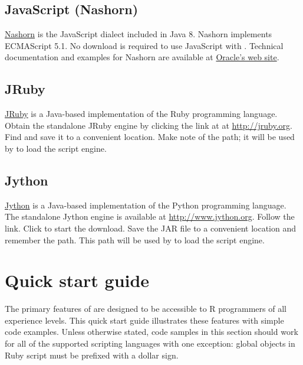 \subsection{JavaScript (Nashorn)}

\href{https://docs.oracle.com/javase/8/docs/technotes/guides/scripting/nashorn/}{Nashorn} is the JavaScript dialect included in Java 8. Nashorn implements ECMAScript 5.1. No download is required to use JavaScript with . Technical documentation and examples for Nashorn are available at \href{https://docs.oracle.com/javase/8/docs/technotes/guides/scripting/nashorn/}{Oracle's web site}.

\subsection{JRuby}

\href{http://jruby.org}{JRuby} is a Java-based implementation of the Ruby programming language. Obtain the standalone JRuby engine by clicking the  link at at \url{http://jruby.org}. Find  and save it to a convenient location. Make note of the path; it will be used by  to load the script engine.

\subsection{Jython}

\href{http://www.jython.org}{Jython} is a Java-based implementation of the Python programming language. The standalone Jython engine is available at \url{http://www.jython.org}. Follow the  link. Click  to start the download. Save the JAR file to a convenient location and remember the path. This path will be used by  to load the script engine.

\section{Quick start guide}

The primary features of  are designed to be accessible to R programmers of all experience levels. This quick start guide illustrates these features with simple code examples. Unless otherwise stated, code samples in this section should work for all of the supported scripting languages with one exception: global objects in Ruby script must be prefixed with a dollar sign.

